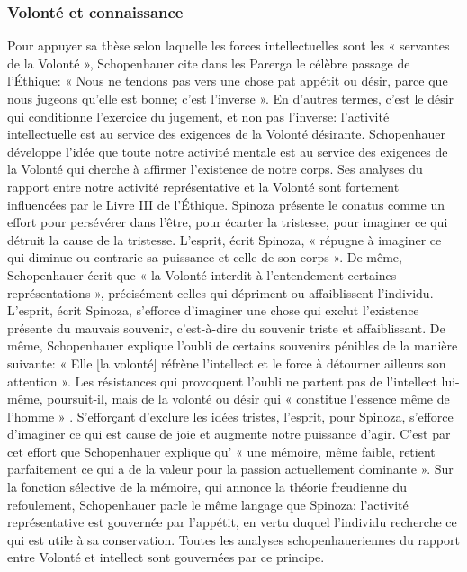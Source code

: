 \subsubsection{Volonté et connaissance}

Pour appuyer sa thèse selon laquelle les forces intellectuelles sont les « servantes de la Volonté »,
Schopenhauer cite dans les Parerga le célèbre passage de l’Éthique: « Nous ne tendons pas vers une chose
pat appétit ou désir, parce que nous jugeons qu’elle est bonne; c’est l’inverse ». En
d’autres termes, c’est le désir qui conditionne l’exercice du jugement, et non pas l’inverse: l’activité
intellectuelle est au service des exigences de la Volonté désirante. Schopenhauer développe l’idée que toute
notre activité mentale est au service des exigences de la Volonté qui cherche à affirmer l’existence de notre
corps. Ses analyses du rapport entre notre activité représentative et la Volonté sont fortement influencées
par le Livre III de l’Éthique.
Spinoza présente le conatus comme un effort pour persévérer dans l’être, pour écarter la tristesse, pour
imaginer ce qui détruit la cause de la tristesse. L’esprit, écrit Spinoza, « répugne à
imaginer ce qui diminue ou contrarie sa puissance et celle de son corps ». De même,
Schopenhauer écrit que « la Volonté interdit à l’entendement certaines représentations », précisément celles
qui dépriment ou affaiblissent l’individu. L’esprit, écrit Spinoza, s’efforce d’imaginer une
chose qui exclut l’existence présente du mauvais souvenir, c’est-à-dire du souvenir triste et
affaiblissant. De même, Schopenhauer explique l’oubli de certains souvenirs pénibles de la manière suivante:
« Elle [la volonté] réfrène l’intellect et le force à détourner ailleurs son attention ».
Les résistances qui provoquent l’oubli ne partent pas de l’intellect lui-même, poursuit-il,
mais de la volonté ou désir qui « constitue l’essence même de l’homme » .
S’efforçant d’exclure les idées tristes, l’esprit, pour Spinoza, s’efforce d’imaginer ce qui est cause de joie
et augmente notre puissance d’agir. C’est par cet effort que Schopenhauer explique qu’
« une mémoire, même faible, retient parfaitement ce qui a de la valeur pour la passion actuellement
dominante ». Sur la fonction sélective de la mémoire, qui annonce la théorie freudienne
du refoulement, Schopenhauer parle le même langage que Spinoza: l’activité représentative est gouvernée
par l’appétit, en vertu duquel l’individu recherche ce qui est utile à sa conservation. Toutes les analyses
schopenhaueriennes du rapport entre Volonté et intellect sont gouvernées par ce principe.
